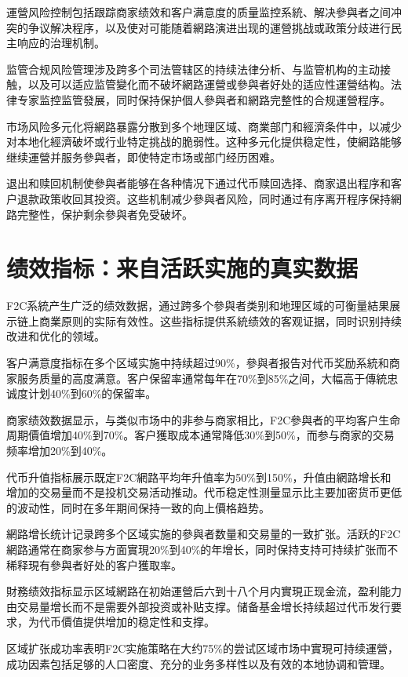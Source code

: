 \documentclass[
  Letterpaper,
]{scrbook}
\begin{document}
運營风险控制包括跟踪商家绩效和客户满意度的质量监控系統、解决參與者之间冲突的争议解决程序，以及使对可能随着網路演进出现的運營挑战或政策分歧进行民主响应的治理机制。

监管合规风险管理涉及跨多个司法管辖区的持续法律分析、与监管机构的主动接触，以及可以适应监管變化而不破坏網路運營或參與者好处的适应性運營结构。法律专家监控监管發展，同时保持保护個人參與者和網路完整性的合规運營程序。

市场风险多元化将網路暴露分散到多个地理区域、商業部门和經濟条件中，以减少对本地化經濟破坏或行业特定挑战的脆弱性。这种多元化提供稳定性，使網路能够继续運營并服务參與者，即使特定市场或部门经历困难。

退出和赎回机制使參與者能够在各种情况下通过代币赎回选择、商家退出程序和客户退款政策收回其投资。这些机制减少參與者风险，同时通过有序离开程序保持網路完整性，保护剩余參與者免受破坏。

\section{绩效指标：来自活跃实施的真实数据}\label{ux7ee9ux6548ux6307ux6807ux6765ux81eaux6d3bux8dc3ux5b9eux65bdux7684ux771fux5b9eux6570ux636e}

F2C系統产生广泛的绩效数据，通过跨多个參與者类别和地理区域的可衡量結果展示链上商業原则的实际有效性。这些指标提供系統绩效的客观证据，同时识别持续改进和优化的领域。

客户满意度指标在多个区域实施中持续超过90\%，參與者报告对代币奖励系統和商家服务质量的高度满意。客户保留率通常每年在70\%到85\%之间，大幅高于傳統忠诚度计划40\%到60\%的保留率。

商家绩效数据显示，与类似市场中的非参与商家相比，F2C參與者的平均客户生命周期價值增加40\%到70\%。客户獲取成本通常降低30\%到50\%，而参与商家的交易频率增加20\%到40\%。

代币升值指标展示既定F2C網路平均年升值率为50\%到150\%，升值由網路增长和增加的交易量而不是投机交易活动推动。代币稳定性测量显示比主要加密货币更低的波动性，同时在多年期间保持一致的向上價格趋势。

網路增长统计记录跨多个区域实施的參與者数量和交易量的一致扩张。活跃的F2C網路通常在商家参与方面實現20\%到40\%的年增长，同时保持支持可持续扩张而不稀释現有參與者好处的客户獲取率。

財務绩效指标显示区域網路在初始運營后六到十八个月内實現正现金流，盈利能力由交易量增长而不是需要外部投资或补贴支撑。储备基金增长持续超过代币发行要求，为代币價值提供增加的稳定性和支撑。

区域扩张成功率表明F2C实施策略在大约75\%的尝试区域市场中實現可持续運營，成功因素包括足够的人口密度、充分的业务多样性以及有效的本地协调和管理。
\end{document}
